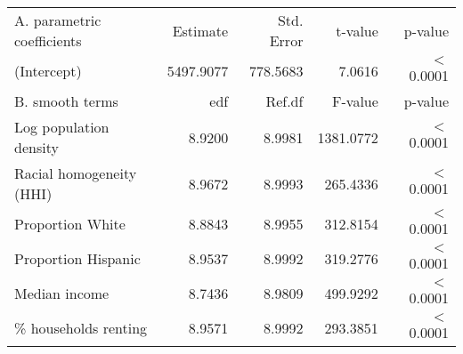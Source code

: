 \begin{table}[ht]
\centering
\begin{tabular}{lrrrr}
   \hline
A. parametric coefficients & Estimate & Std. Error & t-value & p-value \\ 
  (Intercept) & 5497.9077 & 778.5683 & 7.0616 & $<$ 0.0001 \\ 
   \hline
B. smooth terms & edf & Ref.df & F-value & p-value \\ 
  Log population density & 8.9200 & 8.9981 & 1381.0772 & $<$ 0.0001 \\ 
  Racial homogeneity (HHI) & 8.9672 & 8.9993 & 265.4336 & $<$ 0.0001 \\ 
  Proportion White & 8.8843 & 8.9955 & 312.8154 & $<$ 0.0001 \\ 
  Proportion Hispanic & 8.9537 & 8.9992 & 319.2776 & $<$ 0.0001 \\ 
  Median income & 8.7436 & 8.9809 & 499.9292 & $<$ 0.0001 \\ 
  \% households renting & 8.9571 & 8.9992 & 293.3851 & $<$ 0.0001 \\ 
   \hline
\end{tabular}
\caption{ } 
\label{Demographic GAM}
\end{table}
